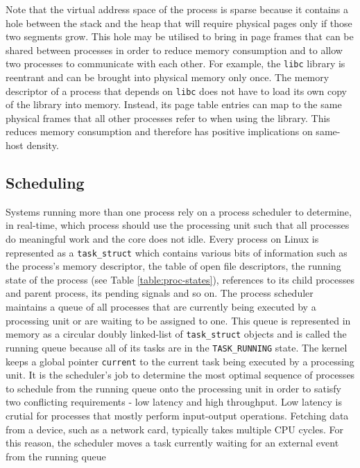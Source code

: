 Note that the virtual address space of the process is sparse because it contains a hole between the 
stack and the heap that will require physical pages only if those two segments grow. This hole may be
utilised to bring in page frames that can be shared between processes in order to reduce memory 
consumption and to allow two processes to communicate with each other. For example, the \verb|libc|
library is reentrant and can be brought into physical memory only once. The memory descriptor of a 
process that depends on \verb|libc| does not have to load its own copy of the library into memory. 
Instead, its page table entries can map to the same physical frames that all other processes refer to 
when using the library. This reduces memory consumption and therefore has positive implications 
on same-host density. 

\subsection{Scheduling}
\label{ch:fundamentals/processes/execution-scheduling}
Systems running more than one process rely on a process scheduler to determine, in real-time, 
which process should use the processing unit such that all processes do meaningful work 
and the core does not idle. Every process on Linux is represented as a \verb|task_struct| \cite{include/linux/sched.h} 
which contains various bits of information such as the process's memory descriptor, the table of 
open file descriptors, the running state of the process (see Table \ref{table:proc-states}), 
references to its child processes and parent process, its pending signals and so on. 
The process scheduler maintains a  queue of all processes that are currently 
being executed by a processing unit or are waiting to be assigned to one. 
This queue is represented in memory as a circular doubly linked-list of \verb|task_struct| 
objects and is called the running queue because all of its tasks are in the \verb|TASK_RUNNING| state.
The kernel keeps a global pointer \verb|current| to the current task being executed by a processing unit. 
It is the scheduler's job to determine the most optimal sequence of processes to schedule from the running queue 
onto the processing unit in order to satisfy two conflicting requirements - low latency and high throughput. 
Low latency is crutial for processes that mostly perform input-output operations. 
Fetching data from a device, such as a network card, typically takes multiple CPU cycles. 
For this reason, the scheduler moves a task currently waiting for an external event from the running queue 
